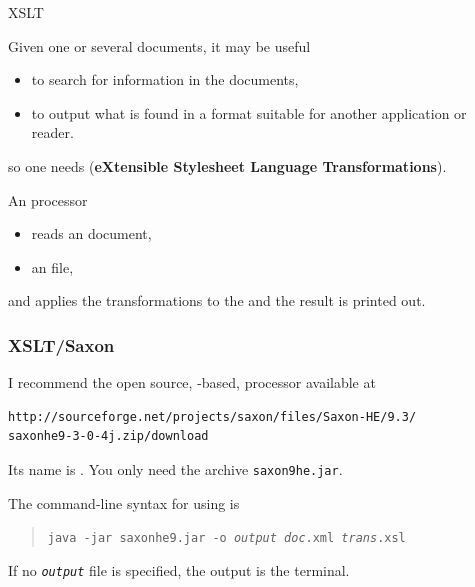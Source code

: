 %
\begin{frame}{XSLT}

Given one or several \XML documents, it may be useful
\begin{itemize}

  \item to search for information in the documents,

  \item to output what is found in a format suitable for another
    application or reader.

\end{itemize}
so one needs \XSLT (\textbf{eXtensible Stylesheet Language
  Transformations}).

\bigskip

An \XSLT processor
\begin{itemize}

  \item reads an \XML document,

  \item an \XSLT file,

\end{itemize}
and applies the transformations to the \XML and the result is printed
out.

\end{frame}

%
\begin{frame}[containsverbatim]
\frametitle{XSLT/Saxon}

I recommend the open source, \Java-based, \XSLT processor available at
\begin{verbatim}
http://sourceforge.net/projects/saxon/files/Saxon-HE/9.3/
saxonhe9-3-0-4j.zip/download
\end{verbatim}
Its name is \Saxon. You only need the archive \texttt{saxon9he.jar}.

\bigskip

The command-line syntax for using \Saxon is
\begin{quote}
\texttt{java -jar saxonhe9.jar -o \emph{output} \emph{doc}.xml
  \emph{trans}.xsl}
\end{quote}
If no \texttt{\emph{output}} file is specified, the output is the
terminal.

\end{frame}

